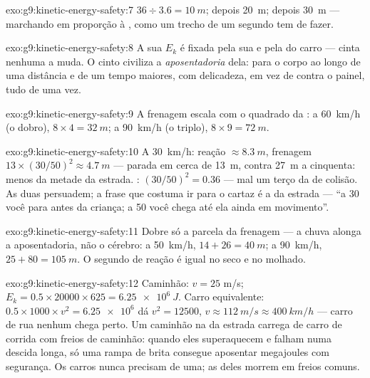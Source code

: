 \begin{solution}{exo:g9:kinetic-energy-safety:7}
$36 \div 3.6 = \qty{10}{m}$; depois \qty{20}{m}; depois \qty{30}{m}
--- marchando em proporção à , como um trecho de um segundo
tem de fazer.
\end{solution}

\begin{solution}{exo:g9:kinetic-energy-safety:8}
A sua $E_k$ é fixada pela sua  e pela  do carro ---
cinta nenhuma a muda. O cinto civiliza a \emph{aposentadoria} dela:
para o corpo ao longo de uma distância e de um tempo maiores, com
delicadeza, em vez de contra o painel, tudo de uma vez.
\end{solution}

\begin{solution}{exo:g9:kinetic-energy-safety:9}
A frenagem escala com o quadrado da : a \qty{60}{km/h} (o
dobro), $8 \times 4 = \qty{32}{m}$; a \qty{90}{km/h} (o triplo),
$8 \times 9 = \qty{72}{m}$.
\end{solution}

\begin{solution}{exo:g9:kinetic-energy-safety:10}
A \qty{30}{km/h}: reação $\approx \qty{8.3}{m}$, frenagem
$13 \times (30/50)^2 \approx \qty{4.7}{m}$ --- parada em cerca de
\qty{13}{m}, contra \qty{27}{m} a cinquenta: menos da metade da
estrada. : $(30/50)^2 = 0.36$ --- mal um terço da  de
colisão. As duas persuadem; a frase que costuma ir para o cartaz é a
da estrada --- ``a 30 você para antes da criança; a 50 você chega até
ela ainda em movimento''.
\end{solution}

\begin{solution}{exo:g9:kinetic-energy-safety:11}
Dobre só a parcela da frenagem --- a chuva alonga a aposentadoria,
não o cérebro: a \qty{50}{km/h}, $14 + 26 = \qty{40}{m}$; a
\qty{90}{km/h}, $25 + 80 = \qty{105}{m}$. O segundo de reação é igual
no seco e no molhado.
\end{solution}

\begin{solution}{exo:g9:kinetic-energy-safety:12}
Caminhão: $v = 25$ \unit{m/s};
$E_k = 0.5 \times 20000 \times 625 = \qty{6.25e6}{J}$. Carro
equivalente: $0.5 \times 1000 \times v^2 = \num{6.25e6}$ dá
$v^2 = 12500$, $v \approx \qty{112}{m/s} \approx \qty{400}{km/h}$ ---
carro de rua nenhum chega perto. Um caminhão na  da estrada
carrega  de carro de corrida com freios de caminhão: quando
eles superaquecem e falham numa descida longa, só uma rampa de brita
consegue aposentar megajoules com segurança. Os carros nunca precisam
de uma; as  deles morrem em freios comuns.
\end{solution}


